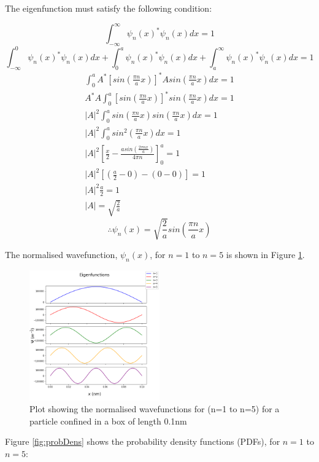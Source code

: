 The eigenfunction must satisfy the following condition:

$$\int_{ -\infty}^{\infty}\psi_n (x)^{*}\psi_n (x)dx = 1$$
$$\int_{ -\infty}^{0}\psi_n (x)^{*}\psi_n (x)dx +\int_{0}^{a}\psi_n (x)^{*}\psi_n (x)dx + \int_{ a}^{\infty}\psi_n (x)^{*}\psi_n (x)dx= 1$$
\begin{align*}
\int_{ 0}^{a} A^{*} [sin(\frac{\pi n}{a}x)]^{*}A sin(\frac{\pi n}{a}x)dx = 1\\
A^{*}A\int_{ 0}^{a} [sin(\frac{\pi n}{a}x)]^{*}sin(\frac{\pi n}{a}x)dx = 1\\
\left | A \right |^2 \int_{ 0}^{a} sin(\frac{\pi n}{a}x) sin(\frac{\pi n}{a}x)dx = 1\\
\left | A \right |^2 \int_{ 0}^{a} sin^{2}(\frac{\pi n}{a}x)dx = 1\\
\left | A \right |^2 \left[\frac{x}{2}-\frac{asin(\frac{2 \pi nx}{a})}{4 \pi n}\right]_0^a= 1\\
\left | A \right |^2 [(\frac{a}{2}-0)-(0-0)]= 1\\
\left | A \right |^2 \frac{a}{2}= 1\\
\left | A \right | = \sqrt{\frac{2}{a}}
\end{align*}
$$\therefore \psi_n (x) = \sqrt{\frac{2}{a}} sin(\frac{\pi n}{a}x)$$

The normalised wavefunction, $\psi_n (x)$, for $n=1$ to $n=5$ is shown in Figure \ref{fig:normWave}.
\begin{figure}[h]
    \centering
    \includegraphics[width=0.5\textwidth]{lab1/images/normalisedWavefunction.png}
    \captionsetup{font = it, labelfont = bf, width=.91\linewidth, justification=centering}
    \caption{Plot showing the normalised wavefunctions for (n=1 to n=5) for a particle confined in a box of length 0.1nm}
    \label{fig:normWave}
\end{figure}

Figure \ref{fig:probDens} shows the probability density functions (PDFs), for $n=1$ to $n=5$:

